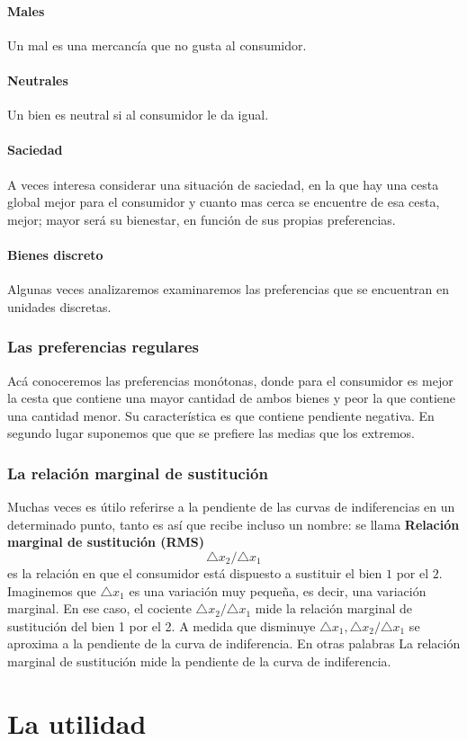 \documentclass[10pt]{article}
\begin{document}
\subsection*{Males}
Un mal es una mercancía que no gusta al consumidor.

\subsection*{Neutrales}
Un bien es neutral si al consumidor le da igual.

\subsection*{Saciedad}
A veces interesa considerar una situación de saciedad, en la que hay una cesta global mejor para el consumidor y cuanto mas cerca se encuentre de esa cesta, mejor; mayor será su bienestar, en función de sus propias preferencias. 

\subsection*{Bienes discreto}
Algunas veces analizaremos examinaremos las preferencias que se encuentran en unidades discretas.

\section*{Las preferencias regulares}
Acá conoceremos las preferencias monótonas, donde para el consumidor es mejor la cesta que contiene una mayor cantidad de ambos bienes y peor la que contiene una cantidad menor. Su característica es que contiene pendiente negativa. En segundo lugar suponemos que que se prefiere las medias que los extremos.

\section*{La relación marginal de sustitución}
Muchas veces es útilo referirse a la pendiente de las curvas de indiferencias en un determinado punto, tanto es así que recibe incluso un nombre: se llama \textbf{Relación marginal de sustitución (RMS)}
$$\triangle x_2 / \triangle x_1$$
es la relación en que el consumidor está dispuesto a sustituir el bien $1$ por el $2$.\\
Imaginemos que $\triangle x_1$ es una variación muy pequeña, es decir, una variación marginal. En ese caso, el cociente $\triangle x_2 / \triangle x_1$ mide la relación marginal de sustitución del bien 1 por el 2. A medida que disminuye $\triangle x_1, \triangle x_2 / \triangle x_1$ se aproxima a la pendiente de la curva de indiferencia. En otras palabras La relación marginal de sustitución mide la pendiente de la curva de indiferencia.

\part*{\center La utilidad}
\end{document}
